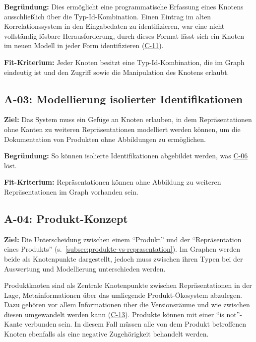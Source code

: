 \textbf{Begründung:}
Dies ermöglicht eine programmatische Erfassung eines Knotens ausschließlich über die Typ-Id-Kombination.
Einen Eintrag im alten Korrelationssystem in den Eingabedaten zu identifizieren, war eine nicht vollständig lösbare Herausforderung, durch dieses Format lässt sich ein Knoten im neuen Modell in jeder Form identifizieren (\hyperref[subsec:c-11-finding-yaml-entries]{C-11}).

\textbf{Fit-Kriterium:}
Jeder Knoten besitzt eine Typ-Id-Kombination, die im Graph eindeutig ist und den Zugriff sowie die Manipulation des Knotens erlaubt.

\subsection{A-03: Modellierung isolierter Identifikationen}\label{subsec:req-nodes-without-identification}

\textbf{Ziel:}
Das System muss ein Gefüge an Knoten erlauben, in dem Repräsentationen ohne Kanten zu weiteren Repräsentationen modelliert werden können, um die Dokumentation von Produkten ohne Abbildungen zu ermöglichen.

\textbf{Begründung:}
So können isolierte Identifikationen abgebildet werden, was \hyperref[subsec:c-06-falle-ohne-aktion-konnen-nicht-dokumentiert-werden]{C-06} löst.

\textbf{Fit-Kriterium:}
Repräsentationen können ohne Abbildung zu weiteren Repräsentationen im Graph vorhanden sein.

\subsection{A-04: Produkt-Konzept}\label{subsec:req-product-concept}

\textbf{Ziel:}
Die Unterscheidung zwischen einem \enquote{Produkt} und der \enquote{Repräsentation eines Produkts} (s.\ \autoref{subsec:produkte-vs-reprasentation}).
Im Graphen werden beide als Knotenpunkte dargestellt, jedoch muss zwischen ihren Typen bei der Auswertung und Modellierung unterschieden werden.

Produktknoten sind als Zentrale Knotenpunkte zwischen Repräsentationen in der Lage, Metainformationen über das umliegende Produkt-Ökosystem abzulegen.
Dazu gehören vor allem Informationen über die Versionsräume und wie zwischen diesen umgewandelt werden kann (\hyperref[subsec:c-13-attribut-abbildung-unzureichend]{C-13}).
Produkte können mit einer \enquote{is not}-Kante verbunden sein.
In diesem Fall müssen alle von dem Produkt betroffenen Knoten ebenfalls als eine negative Zugehörigkeit behandelt werden.

